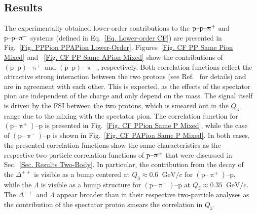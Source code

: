 \documentclass[ALICE,manyauthors]{cernphprep}
\begin{document}
\subsection{Results} \label{Sec. Three-Body results}
The experimentally obtained lower-order contributions to the $\text{p--p--}\uppi^+$ and $\text{p--p--}\uppi^-$ systems (defined in Eq.~\eqref{Eq. Lower-order CF}) are presented in Fig.~\ref{Fig. PPPion PPAPion Lower-Order}. Figures~\ref{Fig. CF PP Same Pion Mixed} and ~\ref{Fig. CF PP Same APion Mixed} show the contributions of $(\text{p--p})\text{--}\uppi^+$ and $(\text{p--p})\text{--}\uppi^-$, respectively. Both correlation functions reflect the attractive strong interaction between the two protons (see Ref.~\cite{ALICE:2018ysd} for details) and are in agreement with each other. This is expected, as the effects of the spectator pion are independent of the charge and only depend on the mass. The signal itself is driven by the FSI between the two protons, which is smeared out in the $Q_3$ range due to the mixing with the spectator pion. The correlation function for $(\text{p--}\uppi^+)\text{--}\text{p}$ is presented in Fig.~\ref{Fig. CF PPion Same P Mixed}, while the case of $(\text{p--}\uppi^-)\text{--}\text{p}$ is shown in Fig.~\ref{Fig. CF PAPion Same P Mixed}. In both cases, the presented correlation functions show the same characteristics as the respective two-particle correlation functions of $\text{p--}\uppi^\pm$ that were discussed in Sec.~\ref{Sec. Results Two-Body}. In particular, the contribution from the decay of the $\Delta^{++}$ is visible as a bump centered at $Q_3 \approx 0.6~\text{ GeV}/c$ for $(\text{p--}\uppi^+)\text{--}\text{p}$, while the $\Lambda$ is visible as a bump structure for $(\text{p--}\uppi^-)\text{--}\text{p}$ at $Q_3 \approx 0.35~\text{ GeV}/c$. The $\Delta^{++}$ and $\Lambda$ appear broader than in their respective two-particle analyses as the contribution of the spectator proton smears the correlation in $Q_3$.
\end{document}

